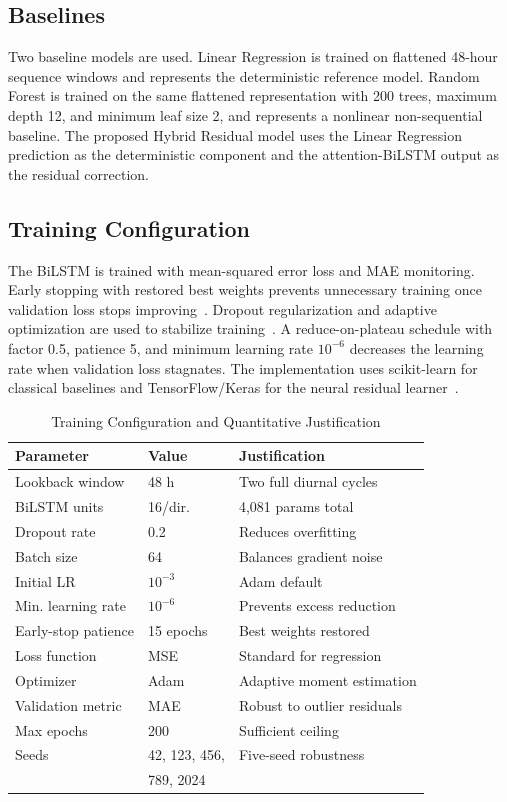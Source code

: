 \documentclass{ieeeaccess}
\begin{document}
\subsection{Baselines}
Two baseline models are used. Linear Regression is trained on flattened 48-hour sequence windows and represents the deterministic reference model. Random Forest is trained on the same flattened representation with 200 trees, maximum depth 12, and minimum leaf size 2, and represents a nonlinear non-sequential baseline. The proposed Hybrid Residual model uses the Linear Regression prediction as the deterministic component and the attention-BiLSTM output as the residual correction.

\subsection{Training Configuration}
The BiLSTM is trained with mean-squared error loss and MAE monitoring. Early stopping with restored best weights prevents unnecessary training once validation loss stops improving~\cite{prechelt}. Dropout regularization and adaptive optimization are used to stabilize training~\cite{kingma,srivastava}. A reduce-on-plateau schedule with factor 0.5, patience 5, and minimum learning rate $10^{-6}$ decreases the learning rate when validation loss stagnates. The implementation uses scikit-learn for classical baselines and TensorFlow/Keras for the neural residual learner~\cite{pedregosa,tensorflow,keras}.

\begin{table}[!t]
\caption{Training Configuration and Quantitative Justification}
\label{tab:training_config}
\centering
\begin{tabular}{lll}
\toprule
Parameter & Value & Justification \\
\midrule
Lookback window & 48 h & Two full diurnal cycles \\
BiLSTM units & 16/dir. & 4,081 params total \\
Dropout rate & 0.2 & Reduces overfitting \\
Batch size & 64 & Balances gradient noise \\
Initial LR & $10^{-3}$ & Adam default \\
Min. learning rate & $10^{-6}$ & Prevents excess reduction \\
Early-stop patience & 15 epochs & Best weights restored \\
Loss function & MSE & Standard for regression \\
Optimizer & Adam & Adaptive moment estimation \\
Validation metric & MAE & Robust to outlier residuals \\
Max epochs & 200 & Sufficient ceiling \\
Seeds & 42, 123, 456, & Five-seed robustness \\
 & 789, 2024 & \\
\bottomrule
\end{tabular}
\end{table}
\end{document}

